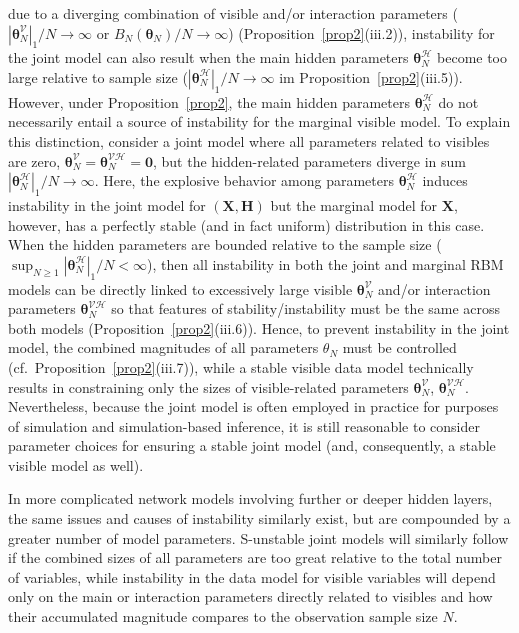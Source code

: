\documentclass[12pt]{article}
\theoremstyle{definition}
\newcommand{\Gam}{B_{N}(\boldsymbol \theta_N) }
\begin{document}
  due to a diverging combination of visible and/or interaction parameters ($|\boldsymbol \theta_N^{\mathcal{V}}|_1/N\to \infty$ or $\Gam/N\to \infty$) (Proposition~\ref{prop2}(iii.2)),  instability for the joint model can also result when the main hidden parameters $\boldsymbol \theta_N^{\mathcal{H}}$ become  too large relative to sample size ($|\boldsymbol \theta_N^{\mathcal{H}}|_1/N\to \infty$ im Proposition~\ref{prop2}(iii.5)).  However, under Proposition~\ref{prop2}, the main hidden parameters $\boldsymbol \theta_N^{\mathcal{H}}$  do not necessarily entail a source of instability for the marginal visible model.  To explain this distinction, consider a joint model where all parameters related to visibles are zero, $\boldsymbol \theta_N^{\mathcal{V}}= \boldsymbol \theta_N^{\mathcal{VH}}=\boldsymbol 0$, but the hidden-related parameters diverge in sum $|\boldsymbol \theta_N^{\mathcal{H}}|_1/N\to \infty$.  Here, the explosive behavior among parameters $\boldsymbol \theta_N^{\mathcal{H}}$ induces instability in the joint model for $(\boldsymbol X, \boldsymbol H)$ but the marginal model for $\boldsymbol X$, however, has a perfectly stable (and in fact uniform) distribution in this case.  When the hidden parameters are bounded relative to the sample size ($\sup_{N\geq 1} |\boldsymbol \theta_N^{\mathcal{H}}|_1/N<\infty$), then all instability in both the joint and marginal RBM models can be directly linked  to
    excessively large visible $\boldsymbol \theta_N^{\mathcal{V}}$ and/or interaction parameters $\boldsymbol \theta_N^{\mathcal{VH}}$ so that features of stability/instability must be the same across both models  (Proposition~\ref{prop2}(iii.6)).
    Hence, to prevent instability in the joint model, the combined magnitudes of all parameters $\theta_N$ must be controlled (cf.~Proposition~\ref{prop2}(iii.7)),  while  a stable visible data model technically results in constraining only the sizes of visible-related parameters $\boldsymbol \theta_N^{\mathcal{V}}$, $\boldsymbol \theta_N^{\mathcal{VH}}$.  Nevertheless, because the joint model is often employed in practice for purposes of simulation and simulation-based inference, it is still reasonable to consider parameter choices for ensuring a stable joint model (and, consequently, a stable visible model as well).

  In more complicated network models involving further or deeper hidden layers, the same issues and causes of instability similarly exist, but are compounded by a greater number of model parameters.  S-unstable joint models will similarly follow if the combined sizes of all parameters are too great relative to the total number of variables, while instability in the data model for visible variables will depend only on
  the  main or interaction parameters  directly related to visibles and how their accumulated magnitude compares to the observation sample size $N$.
\end{document}
